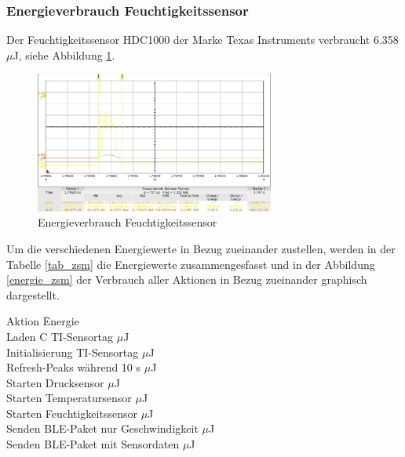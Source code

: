 \subsubsection*{Energieverbrauch Feuchtigkeitssensor}

Der Feuchtigkeitssensor HDC1000 der Marke Texas Instruments verbraucht 6.358 $\mu$J, siehe Abbildung \ref{energie_humidity}.

\begin{figure}[ht]
  \includegraphics[width=0.7\textwidth]{3Vorgehen/imag/Humidity.png}
  \caption{Energieverbrauch Feuchtigkeitssensor}
  \label{energie_humidity}
\end{figure}

\enlargethispage*{15cm}

\clearpage
Um die verschiedenen Energiewerte in Bezug zueinander zustellen, werden in der Tabelle \ref{tab_zsm} die Energiewerte zusammengesfasst und in der Abbildung \ref{energie_zsm} der Verbrauch aller Aktionen in Bezug zueinander graphisch dargestellt. 


\begin{minipage}{\textwidth}
\label{tab_zsm}
\begin{tabbing}
    Aktion \hspace{6cm}                       \quad\= Energie \\[0.8ex]
    Laden C TI-Sensortag             $\mu$J \\
    Initialisierung TI-Sensortag     $\mu$J \\
    Refresh-Peaks während 10 s       $\mu$J \\
    Starten Drucksensor              $\mu$J \\
    Starten Temperatursensor          $\mu$J \\
    Starten Feuchtigkeitssensor      $\mu$J \\
    Senden BLE-Paket nur Geschwindigkeit $\mu$J\\
    Senden BLE-Paket mit Sensordaten    $\mu$J \\
\end{tabbing}
\end{minipage}

